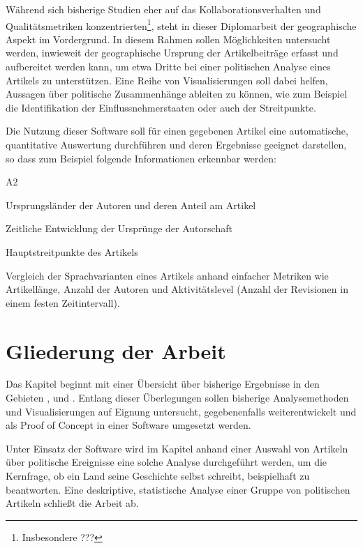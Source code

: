Während sich bisherige Studien eher auf das Kollaborationsverhalten und Qualitätsmetriken konzentrierten\footnote{Insbesondere ???}, steht in dieser Diplomarbeit der geographische Aspekt im Vordergrund.
In diesem Rahmen sollen Möglichkeiten untersucht werden, inwieweit der geographische Ursprung der Artikelbeiträge erfasst und aufbereitet werden kann, um etwa Dritte bei einer politischen Analyse eines Artikels zu unterstützen.
Eine Reihe von Visualisierungen soll dabei helfen, Aussagen über politische Zusammenhänge ableiten zu können, wie zum Beispiel die Identifikation der Einflussnehmerstaaten oder auch der Streitpunkte. 

Die Nutzung dieser Software soll für einen gegebenen Artikel eine automatische, quantitative Auswertung durchführen und deren Ergebnisse geeignet darstellen, so dass zum Beispiel folgende Informationen erkennbar werden:

\begin{labeling}{A2}
\item[A1] Ursprungsländer der Autoren und deren Anteil am Artikel
\item[A2] Zeitliche Entwicklung der Ursprünge der Autorschaft
\item[A3] Hauptstreitpunkte des Artikels
\item[A4] Vergleich der Sprachvarianten eines Artikels anhand einfacher Metriken wie Artikellänge, Anzahl der Autoren und Aktivitätslevel (Anzahl der Revisionen in einem festen Zeitintervall).
\end{labeling}



\section{Gliederung der Arbeit}

Das Kapitel  beginnt mit einer Übersicht über bisherige Ergebnisse in den Gebieten ,  und .
Entlang dieser Überlegungen sollen bisherige Analysemethoden und Visualisierungen auf Eignung untersucht, gegebenenfalls weiterentwickelt und als Proof of Concept in einer Software umgesetzt werden.

Unter Einsatz der Software wird im Kapitel  anhand einer Auswahl von Artikeln über politische Ereignisse eine solche Analyse durchgeführt werden, um die Kernfrage, ob ein Land seine Geschichte selbst schreibt, beispielhaft zu beantworten. 
Eine deskriptive, statistische Analyse einer Gruppe von politischen Artikeln schließt die Arbeit ab. 
